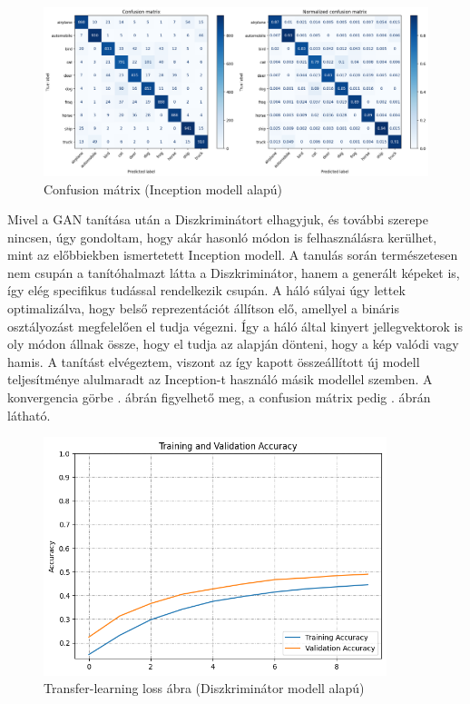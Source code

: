 \begin{figure}[h]
	\centering
	\includegraphics[width=15cm]{images/transfer_confusion.png}
	\caption{Confusion mátrix (Inception modell alapú)}
	\label{fig:transfer_confusion}
\end{figure}

Mivel a GAN tanítása után a Diszkriminátort elhagyjuk, és további szerepe nincsen, úgy gondoltam, hogy akár hasonló módon is felhasználásra kerülhet, mint az előbbiekben ismertetett Inception modell. A tanulás során természetesen nem csupán a tanítóhalmazt látta a Diszkriminátor, hanem a generált képeket is, így elég specifikus tudással rendelkezik csupán. A háló súlyai úgy lettek optimalizálva, hogy belső reprezentációt állítson elő, amellyel a bináris osztályozást megfelelően el tudja végezni. Így a háló által kinyert jellegvektorok is oly módon állnak össze, hogy el tudja az alapján dönteni, hogy a kép valódi vagy hamis. A tanítást elvégeztem, viszont az így kapott összeállított új modell teljesítménye alulmaradt az Inception-t használó másik modellel szemben. A konvergencia görbe . ábrán figyelhető meg, a confusion mátrix pedig . ábrán látható.

\begin{figure}[h!]
	\centering
	\includegraphics[width=10cm]{images/transfer_discriminator.png}
	\caption{Transfer-learning loss ábra (Diszkriminátor modell alapú)}
	\label{fig:transfer_learning_loss_discriminator}
\end{figure}

